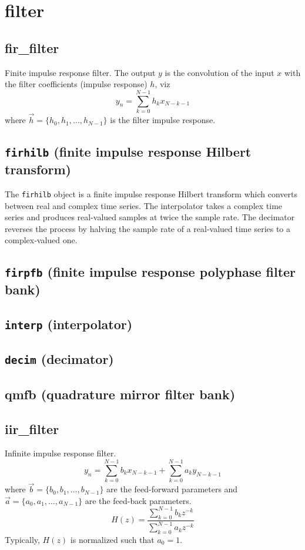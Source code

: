 % 
%
\section{filter}
\label{module:filter}

\subsection{fir\_filter}
Finite impulse response filter.
The output $y$ is the convolution of the input $x$ with the filter
coefficients (impulse response) $h$, viz
\[
    y_n = \sum_{k=0}^{N-1}{ h_k x_{N-k-1} }
\]
where $\vec{h} = \{h_0,h_1,\ldots,h_{N-1}\}$ is the filter impulse response.

\subsection{{\tt firhilb} (finite impulse response Hilbert transform)}
The {\tt firhilb} object is a finite impulse response Hilbert transform which
converts between real and complex time series.
The interpolator takes a complex time series and produces real-valued samples
at twice the sample rate.
The decimator reverses the process by halving the sample rate of a real-valued
time series to a complex-valued one.



\subsection{{\tt firpfb} (finite impulse response polyphase filter bank)}

\subsection{{\tt interp} (interpolator)}

\subsection{{\tt decim} (decimator)}

\subsection{qmfb (quadrature mirror filter bank)}

\subsection{iir\_filter}
Infinite impulse response filter.
\[
    y_n = \sum_{k=0}^{N-1}{ b_k x_{N-k-1} } +
          \sum_{k=0}^{N-1}{ a_k y_{N-k-1} }
\]
where $\vec{b} = \{b_0,b_1,\ldots,b_{N-1}\}$ are the feed-forward parameters
and $\vec{a} = \{a_0,a_1,\ldots,a_{N-1}\}$ are the feed-back parameters.
\[
    H(z) = \frac{\sum_{k=0}^{N-1}{b_k z^{-k}}}
                {\sum_{k=0}^{N-1}{a_k z^{-k}}}
\]
Typically, $H(z)$ is normalized such that $a_0=1$.

